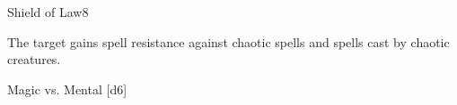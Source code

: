 \begin{spellsection}{Shield of Law}{8}
    \begin{spellheader}
    \end{spellheader}
    \begin{spellcontent}
        \begin{spelltargetinginfo}
        \end{spelltargetinginfo}
        \begin{spelleffects}
            \spelleffect The target gains spell resistance against chaotic spells and spells cast by chaotic creatures.
            \spelldur \durshort \dismissable
        \end{spelleffects}
    \end{spellcontent}
    \begin{spellsubcontent}
        \begin{spelltargetinginfo}
        \end{spelltargetinginfo}
        \begin{spelleffects}
            \begin{spellattack}{Magic vs. Mental}
                \spellsuccess {}[d6]
            \end{spellattack}
        \end{spelleffects}
    \end{spellsubcontent}
    \begin{spellfooter}
        \miscastexplode
    \end{spellfooter}
\end{spellsection}

